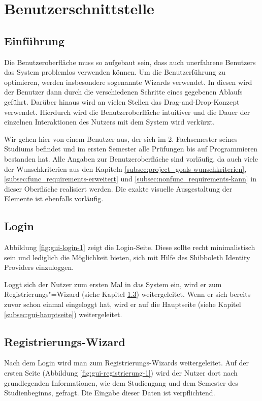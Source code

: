 \section{Benutzerschnittstelle}

\subsection{Einführung}
Die Benutzeroberfläche muss so aufgebaut sein, dass auch unerfahrene \glspl{Benutzer} das System problemlos verwenden können.
Um die Benutzerführung zu optimieren, werden insbesondere sogenannte \glspl{Wizard} verwendet. In diesen wird der Benutzer dann durch die verschiedenen Schritte eines gegebenen Ablaufs geführt. Darüber hinaus wird an vielen Stellen das \gls{Drag-and-Drop}-Konzept verwendet.
Hierdurch wird die Benutzeroberfläche intuitiver und die Dauer der einzelnen Interaktionen des Nutzers mit dem System wird verkürzt.

Wir gehen hier von einem \gls{Benutzer} aus, der sich im 2. Fachsemester seines Studiums befindet und im ersten Semester alle Prüfungen bis auf Programmieren bestanden hat.
Alle Angaben zur Benutzeroberfläche sind vorläufig, da auch viele der Wunschkriterien aus den Kapiteln \ref{subsec:project_goals-wunschkriterien}, \ref{subsec:func_requirements-erweitert} und \ref{subsec:nonfunc_requirements-kann} in dieser Oberfläche realisiert werden. Die exakte visuelle Ausgestaltung der Elemente ist ebenfalls vorläufig.
\subsection{Login}
Abbildung \ref{fig:gui-login-1} zeigt die Login-Seite. Diese sollte recht minimalistisch sein und lediglich die Möglichkeit bieten, sich mit Hilfe des \gls{Shibboleth Identity Provider}s einzuloggen.

Loggt sich der Nutzer zum ersten Mal in das System ein, wird er zum Registrierungs"=\gls{Wizard} (siehe Kapitel \ref{subsec:gui-registrierung}) weitergeleitet. Wenn er sich bereits zuvor schon einmal eingeloggt hat, wird er auf die Hauptseite (siehe Kapitel \ref{subsec:gui-hauptseite}) weitergeleitet.
\subsection{Registrierungs-Wizard}
\label{subsec:gui-registrierung}
Nach dem Login wird man zum Registrierungs-\gls{Wizard}s weitergeleitet. Auf der ersten Seite (Abbildung \ref{fig:gui-registrierung-1}) wird der Nutzer dort nach grundlegenden Informationen, wie dem \gls{Studiengang} und dem \gls{Semester des Studienbeginns}, gefragt. Die Eingabe dieser Daten ist verpflichtend.

